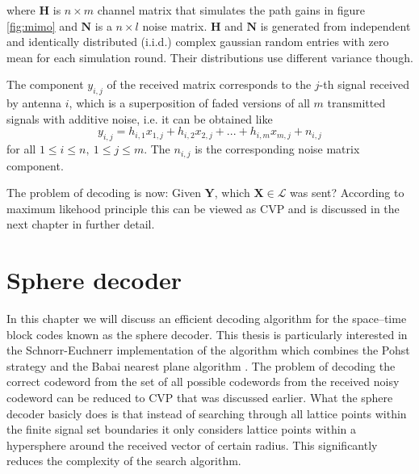 \documentclass[english,12pt,a4paper,pdftex,sci,utf8]{aaltothesis}
\begin{document}
where $\mathbf{H}$ is $n \times m$ channel matrix that simulates the path gains in figure \ref{fig:mimo} and $\mathbf{N}$ is a $n\times l$ noise matrix. $\mathbf{H}$ and $\mathbf{N}$ is generated from independent and identically distributed  (i.i.d.) complex gaussian random entries with zero mean for each simulation round. Their distributions use different variance though. 
\par The component $y_{i,j}$ of the received matrix corresponds to the $j$-th signal received by antenna $i$, which is a superposition of faded versions of all $m$ transmitted signals with additive noise, i.e. it can be obtained like
\begin{equation}
y_{i,j} = h_{i,1}x_{1,j}+h_{i,2}x_{2,j}+...+h_{i,m}x_{m,j}+n_{i,j}   
\label{eq:component}
\end{equation}
for all $1 \leq i \leq n, \ 1 \leq j \leq m$. The $n_{i,j}$ is the corresponding noise matrix component.
\par The problem of decoding is now: Given $\mathbf{Y}$, which $\mathbf{X} \in \mathcal{L}$ was sent? According to maximum likehood principle this can be viewed as CVP \cite{mia} and is discussed in the next chapter in further detail.

\clearpage

\section{Sphere decoder}

In this chapter we will discuss an efficient decoding algorithm for the space--time block codes known as the sphere decoder. This thesis is particularly interested in the Schnorr-Euchnerr implementation of the algorithm which combines the Pohst strategy and the Babai nearest plane algorithm \cite{agrell}. The problem of decoding the correct codeword from the set of all possible codewords from the received noisy codeword can be reduced to CVP that was discussed earlier. What the sphere decoder basicly does is that instead of searching through all lattice points within the finite signal set boundaries it only considers lattice points within a hypersphere around the received vector of certain radius. This significantly reduces the complexity of the search algorithm. 
\end{document}
